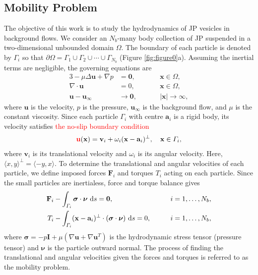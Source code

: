\documentclass[lineno]{jfm}
\renewcommand{\aa}{\mathbf{a}}
\newcommand{\bd}{\partial}
\newcommand{\FF}{\mathbf{F}}
\newcommand{\nnu}{\boldsymbol{\nu}}
\newcommand{\ssigma}{\boldsymbol{\sigma}}
\newcommand{\xx}{\mathbf{x}}
\newcommand{\uu}{\mathbf{u}}
\renewcommand{\vv}{\mathbf{v}}
\newcommand{\ReviewerOne}[1]{\textcolor{red}{#1}}
\begin{document}
\subsection{\label{mobility}Mobility Problem}
The objective of this work is to study the hydrodynamics of JP vesicles
in background flows. We consider an $N_b$-many body collection of JP
suspended in a two-dimensional unbounded domain $\Omega$. The boundary
of each particle is denoted by $\Gamma_i$ so that $\bd \Omega = \Gamma_1
\cup \Gamma_2 \cup \cdots \cup \Gamma_{N_b}$ (Figure
\ref{fig:figure0}a). Assuming the inertial terms are negligible, the
governing equations are
\begin{alignat}{3}
\label{eq:stokes}
  -\mu \Delta \uu + \nabla p &= \mathbf{0}, 
    && \xx \in \Omega, \\
  \nabla\cdot \uu &= 0, \qquad && \xx \in \Omega, \\
  \uu - \uu_\infty &\to \mathbf{0}, && |\xx| \to \infty,
\end{alignat}
%
where $\uu$ is the velocity, $p$ is the
pressure, $\uu_\infty$ is the background flow, and $\mu$ is the constant viscosity. 
%
Since each particle $\Gamma_i$ with centre $\aa_i$ is a rigid body, its velocity satisfies 
\ReviewerOne{the no-slip boundary condition}
\begin{align}
\label{eq:rigid_bc}
  \ReviewerOne{\uu}(\xx) = \vv_i + \omega_i (\xx - \aa_i)^\perp, \quad 
    \xx \in \Gamma_i,
\end{align}
where $\vv_i$ is its translational velocity and $\omega_i$ is its
angular velocity. Here, $\langle x, y \rangle^{\perp} = \langle -y, x
\rangle$.
%
%
%
%
To determine the translational and angular velocities of each particle,
we define imposed forces $\FF_i$ and torques $T_i$ acting on each
particle. Since the small particles are inertialess, force and torque
balance gives 
\begin{alignat}{2}
  \label{eq:force}
  \FF_i &- \int_{\Gamma_i} \ssigma \cdot \nnu \, \dif s = \mathbf{0},
  && i=1,\ldots,N_b,\\
  \label{eq:torque}
  T_i &- \int_{\Gamma_i} (\xx - \aa_i)^\perp \cdot 
    (\ssigma \cdot \nnu) \, \dif s = 0, \qquad && i=1,\ldots,N_b,
\end{alignat}
where $\ssigma = -p \mathbf{I} + \mu \left(\nabla \uu + \nabla \uu^T
\right)$ is the hydrodynamic stress tensor (pressure tensor) and
$\nnu$ is the particle outward normal. The process of finding the
translational and angular velocities given the forces and torques is
referred to as the mobility problem.
\end{document}
